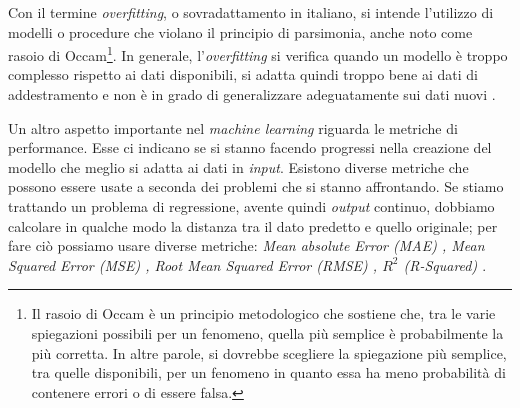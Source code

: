 \documentclass[12pt,italian]{report}
\begin{document}
	\label{Overfitting}
	Con il termine \textit{overfitting}, o sovradattamento in italiano, si intende l'utilizzo di modelli o procedure che violano il principio di parsimonia, anche noto come rasoio di Occam\footnote{Il rasoio di Occam è un principio metodologico che sostiene che, tra le varie spiegazioni possibili per un fenomeno, quella più semplice è probabilmente la più corretta. In altre parole, si dovrebbe scegliere la spiegazione più semplice, tra quelle disponibili, per un fenomeno in quanto essa ha meno probabilità di contenere errori o di essere falsa.}. In generale, l'\textit{overfitting} si verifica quando un modello è troppo complesso rispetto ai dati disponibili, si adatta quindi troppo bene ai dati di addestramento e non è in grado di generalizzare adeguatamente sui dati nuovi \cite{hawkins2004problem}. 
	
	\label{Metriche_di_performance}
	Un altro aspetto importante nel \textit{machine learning} riguarda le metriche di performance. Esse ci indicano se si stanno facendo progressi nella creazione del modello che meglio si adatta ai dati in \textit{input}. Esistono diverse metriche che possono essere usate a seconda dei problemi che si stanno affrontando. Se stiamo trattando un problema di regressione, avente quindi \textit{output} continuo, dobbiamo calcolare in qualche modo la distanza tra il dato predetto e quello originale; per fare ciò possiamo usare diverse metriche: \textit{Mean absolute Error (MAE) \cite{chai2014root}, Mean Squared Error (MSE) \cite{das2004mean}, Root Mean Squared Error (RMSE) \cite{chai2014root}, $R^2$ (R-Squared) \cite{cameron1997r}}.
	
\end{document}
